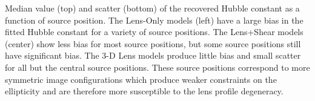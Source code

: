 \label{fig:srcpos} Median value (top) and scatter (bottom) of the recovered Hubble constant as a function of source position. The Lens-Only models (left) have a large bias in the fitted Hubble constant for a variety of source positions. The Lens+Shear models (center) show less bias for most source positions, but some source positions still have significant bias. The 3-D Lens models produce little bias and small scatter for all but the central source positions. These source positions correspond to more symmetric image configurations which produce weaker constraints on the ellipticity and are therefore more susceptible to the lens profile degeneracy.